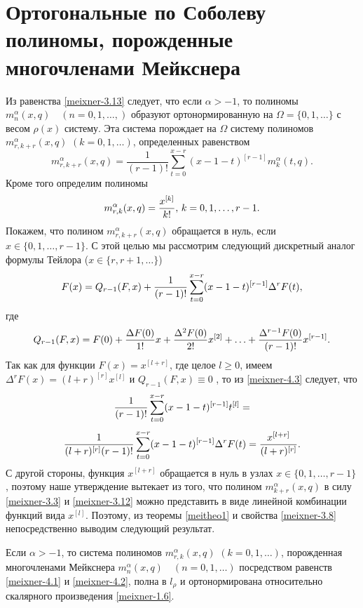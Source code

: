 \section{Ортогональные по Соболеву полиномы, порожденные многочленами Мейкснера}
Из равенства \eqref{meixner-3.13} следует, что если $\alpha>-1$, то полиномы $m_n^\alpha(x,q)\quad(n=0,1,\ldots, )$ образуют ортонормированную на $\Omega=\{0,1,\ldots\}$       с весом $\rho(x)$  систему.  Эта система порождает на $\Omega$  систему полиномов $m_{r,k+r}^{\alpha}(x,q)$ $(k=0, 1,\ldots)$, определенных равенством
 \begin{equation}\label{meixner-4.1}
m_{r,k+r}^{\alpha}(x,q)=\frac{1}{(r-1)!}
\sum\limits_{t=0}^{x-r}(x-1-t)^{[r-1]}m_{k}^{\alpha}(t,q).
\end{equation}
Кроме того определим полиномы
 \begin{equation}\label{meixner-4.2}
m_{r,k}^{\alpha}(x,q)={x^{[k]}\over k!},\, k=0,1,\ldots,r-1.
\end{equation}
 Покажем, что полином $m_{r,k+r}^{\alpha}(x,q)$ обращается в нуль, если $x\in\{0,1,\ldots,r-1\}$.  С этой целью мы рассмотрим следующий дискретный аналог формулы Тейлора ($x\in\{r,r+1,\ldots\}$)
 \begin{equation}\label{meixner-4.3}
F(x)=Q_{r-1}(F,x) + {1\over(r-1)!}\sum_{t=0}^{x-r} (x-1-t)^{[r-1]}\Delta^rF(t),
\end{equation}
где
\begin{equation}\label{meixner-4.4}
Q_{r-1}(F,x)= F(0)+{\Delta F(0)\over 1!}x+{\Delta^2 F(0)\over 2!}
x^{[2]}+\ldots+{\Delta^{r-1} F(0)\over (r-1)!}x^{[r-1]}.
\end{equation}
Так как для функции $F(x)=x^{[l+r]}$, где целое $l\ge0$, имеем $\Delta^r F(x)=(l+r)^{[r]}x^{[l]}$ и   $Q_{r-1}(F,x)\equiv0$ , то из \eqref{meixner-4.3} следует, что
$$
{1\over(r-1)!}\sum_{t=0}^{x-r} (x-1-t)^{[r-1]}t^{[l]}=
$$
\begin{equation}\label{meixner-4.5}
 {1\over(l+r)^{[r]}(r-1)!}\sum_{t=0}^{x-r} (x-1-t)^{[r-1]}\Delta^rF(t)=\frac{x^{[l+r]}}{(l+r)^{[r]}}.
\end{equation}
С другой стороны, функция $x^{[l+r]}$ обращается в нуль в узлах $x\in\{0,1,\ldots,r-1\}$, поэтому наше утверждение вытекает из того, что полином  $m_{k+r}^{\alpha}(x,q)$ в силу \eqref{meixner-3.3} и \eqref{meixner-3.12} можно представить в виде линейной комбинации функций вида $x^{[l]}$. Поэтому, из теоремы \eqref{meitheo1} и свойства \eqref{meixner-3.8} непосредственно выводим  следующий результат.

\begin{theorem}\label{meitheo2}
Если $\alpha>-1$, то система полиномов $m_{r,k}^{\alpha}(x,q)$ $(k=0, 1,\ldots)$, порожденная многочленами Мейкснера $m_n^{\alpha}(x,q)\quad(n=0,1,\ldots)$ посредством равенств \eqref{meixner-4.1} и \eqref{meixner-4.2}, полна  в $l_\rho$ и ортонормирована относительно скалярного произведения \eqref{meixner-1.6}.
\end{theorem}

